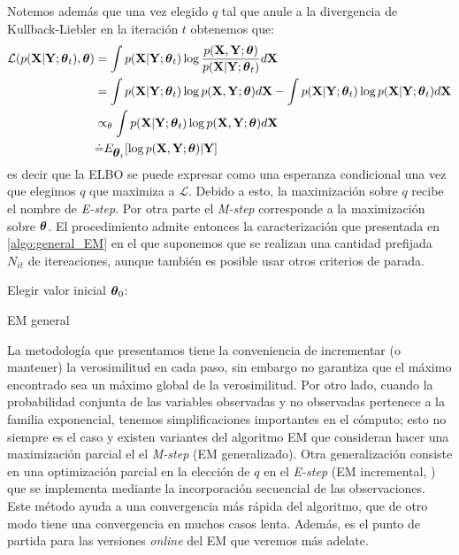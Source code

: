 Notemos además que una vez elegido $q$ tal que anule a la divergencia de Kullback-Liebler en la iteración $t$ obtenemos que:
\begin{align*}
    \mathcal{L}(p(\mathbf{X} | \mathbf{Y}; \mbox{\boldmath$ \theta $}_t), \mbox{\boldmath$ \theta $}) &= \int p(\mathbf{X} | \mathbf{Y}; \mbox{\boldmath$ \theta $}_t) \log \frac{p(\mathbf{X}, \mathbf{Y}; \mbox{\boldmath$ \theta $})}{p(\mathbf{X} | \mathbf{Y}; \mbox{\boldmath$ \theta $}_t)} d\mathbf{X} \\
    &= \int p(\mathbf{X} | \mathbf{Y}; \mbox{\boldmath$ \theta $}_t) \log p(\mathbf{X}, \mathbf{Y}; \mbox{\boldmath$ \theta $}) d\mathbf{X} - \int p(\mathbf{X} | \mathbf{Y}; \mbox{\boldmath$ \theta $}_t) \log p(\mathbf{X} | \mathbf{Y}; \mbox{\boldmath$ \theta $}_t) d\mathbf{X} \\
    &\propto_{\theta} \int p(\mathbf{X} | \mathbf{Y}; \mbox{\boldmath$ \theta $}_t) \log p(\mathbf{X}, \mathbf{Y}; \mbox{\boldmath$ \theta $}) d\mathbf{X} \\
    &\dot{=} E_{\mbox{\boldmath$ \theta $}_t}[\log p(\mathbf{X}, \mathbf{Y}; \mbox{\boldmath$ \theta $})| \mathbf{Y}]
\end{align*}
es decir que la ELBO se puede expresar como una esperanza condicional una vez que elegimos $q$ que maximiza a $\mathcal{L}$. Debido a esto, la maximización sobre $q$ recibe el nombre de \textit{E-step}. Por otra parte el \textit{M-step} corresponde a la maximización sobre $\mbox{\boldmath$ \theta $}$. El procedimiento admite entonces la caracterización que presentada en \ref{algo:general_EM} en el que suponemos que se realizan una cantidad prefijada $N_{it}$ de itereaciones, aunque también es posible usar otros criterios de parada.

\begin{algorithm}[H]\label{algo:general_EM}
    Elegir valor inicial $\mbox{\boldmath$ \theta $}_0$: \\
\caption{EM general}
\end{algorithm}

La metodología que presentamos tiene la conveniencia de incrementar (o mantener) la verosimilitud en cada paso, sin embargo no garantiza que el máximo encontrado sea un máximo global de la verosimilitud. Por otro lado, cuando la probabilidad conjunta de las variables observadas y no observadas pertenece a la familia exponencial, tenemos simplificaciones importantes en el cómputo; esto no siempre es el caso y existen variantes del algoritmo EM que consideran hacer una maximización parcial el el \textit{M-step} (EM generalizado). Otra generalización consiste en una optimización parcial en la elección de $q$ en el \textit{E-step} (EM incremental, \cite{Neal1998}) que se implementa mediante la incorporación secuencial de las observaciones. Este método ayuda a una convergencia más rápida del algoritmo, que de otro modo tiene una convergencia en muchos casos lenta. Además, es el punto de partida para las versiones \textit{online} del EM que veremos más adelate.

